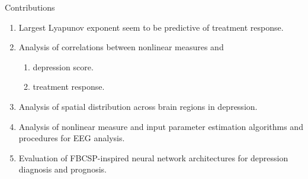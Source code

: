 \documentclass{beamer}
\begin{document}


\begin{frame}{Contributions}
    \centering
    \begin{enumerate}
        \item<1-> Largest Lyapunov exponent seem to be predictive of treatment response.
        \item<2-> Analysis of correlations between nonlinear measures and
          \begin{enumerate}
            \item depression score.
            \item treatment response.
          \end{enumerate}
        \item<3-> Analysis of spatial distribution across brain regions in depression.
        \item<4-> Analysis of nonlinear measure and input parameter estimation algorithms and procedures for EEG analysis.
        \item<5-> Evaluation of FBCSP-inspired neural network architectures for depression diagnosis and prognosis.
    \end{enumerate}
\end{frame}
\end{document}
